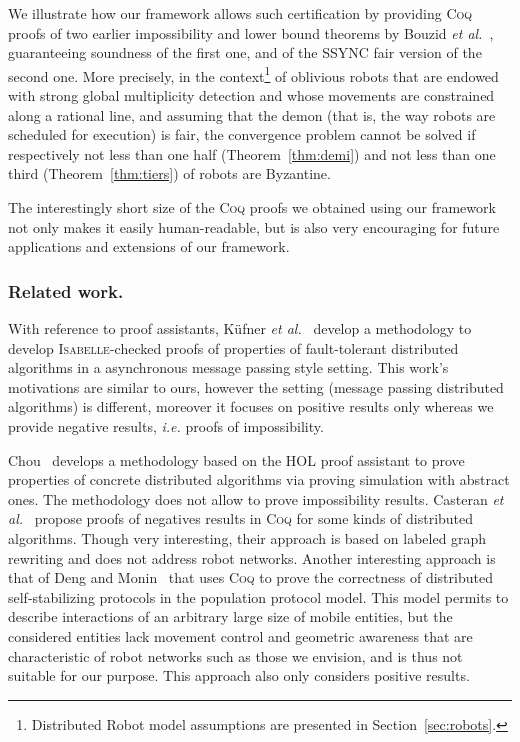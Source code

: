 \documentclass[11pt,a4]{llncs}
\newcommand{\x}{\xspace}
\newcommand{\coq}{\textsc{Coq}\x}
\begin{document}
We illustrate how our framework allows such certification by
providing \coq proofs of two earlier impossibility and lower bound 
theorems by Bouzid \emph{et
  al.}~\cite{bouzid10tcs}, guaranteeing soundness of the first one,
and of the SSYNC fair version of the second one. More precisely, in the
context\footnote{Distributed Robot model assumptions are presented in Section~\ref{sec:robots}.} of oblivious robots that are endowed with strong global
multiplicity detection and whose movements are constrained along a
rational line, and assuming that the demon (that is, the way robots
are scheduled for execution) is fair, the
convergence problem cannot be solved if respectively not less than one
half (Theorem~\ref{thm:demi}) and not less than one third
(Theorem~\ref{thm:tiers}) of robots are Byzantine.

The interestingly short size of the \coq proofs we obtained using our
framework not only makes it easily human-readable, but is also very
encouraging for future applications and extensions of our framework.

\subsubsection*{Related work.}

With reference to proof assistants, K\"ufner \emph{et
al.}~\cite{kuefner12ifiptcs} develop a methodology to develop
\textsc{Isabelle}-checked proofs of properties of fault-tolerant
distributed algorithms in a asynchronous message passing style
setting. This work's motivations are similar to ours, however the
setting (message passing distributed algorithms) is different,
moreover it focuses on {positive} results only whereas we provide
{negative} results, \emph{i.e.} proofs of impossibility.

Chou~\cite{chou95cj} develops a methodology based on the HOL proof
assistant to prove properties of concrete distributed algorithms via
proving simulation with abstract ones. The methodology does not allow
to prove impossibility results.
Casteran \emph{et al.}~\cite{casteran09scss} propose proofs of
negatives results in \coq for some kinds of
distributed algorithms. Though very interesting, their approach is
based on labeled graph rewriting and does not address robot
networks. Another interesting approach is that of Deng and
Monin~\cite{deng09tase} that uses \coq to prove the correctness of
distributed self-stabilizing protocols in the population protocol
model. This model permits to describe interactions of an arbitrary
large size of mobile entities, but the considered entities lack
movement control and geometric awareness that are characteristic of
robot networks such as those we envision, and is thus not suitable for
our purpose. This approach also only considers positive results.
\end{document}
